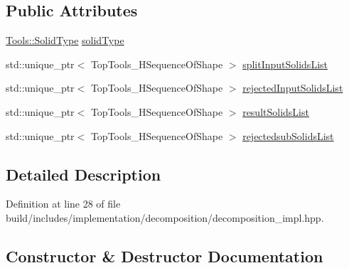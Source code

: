 \subsection*{Public Attributes}
\begin{DoxyCompactItemize}
\item 
\hyperlink{classMcCAD_1_1Tools_1_1SolidType}{Tools\+::\+Solid\+Type} \hyperlink{classMcCAD_1_1Decomposition_1_1Decompose_1_1Impl_a4d66091bde14a60985a5998376612a6c}{solid\+Type}
\item 
std\+::unique\+\_\+ptr$<$ Top\+Tools\+\_\+\+H\+Sequence\+Of\+Shape $>$ \hyperlink{classMcCAD_1_1Decomposition_1_1Decompose_1_1Impl_a9da06719a71fdc8438190a3c3112e82b}{split\+Input\+Solids\+List}
\item 
std\+::unique\+\_\+ptr$<$ Top\+Tools\+\_\+\+H\+Sequence\+Of\+Shape $>$ \hyperlink{classMcCAD_1_1Decomposition_1_1Decompose_1_1Impl_afa4c71b9552009320911095b0e9c638e}{rejected\+Input\+Solids\+List}
\item 
std\+::unique\+\_\+ptr$<$ Top\+Tools\+\_\+\+H\+Sequence\+Of\+Shape $>$ \hyperlink{classMcCAD_1_1Decomposition_1_1Decompose_1_1Impl_a75b53d768ed797dff26c6bf7308f0bea}{result\+Solids\+List}
\item 
std\+::unique\+\_\+ptr$<$ Top\+Tools\+\_\+\+H\+Sequence\+Of\+Shape $>$ \hyperlink{classMcCAD_1_1Decomposition_1_1Decompose_1_1Impl_a513935cebc47e2e4dd599963bfbb8008}{rejectedsub\+Solids\+List}
\end{DoxyCompactItemize}


\subsection{Detailed Description}


Definition at line 28 of file build/includes/implementation/decomposition/decomposition\+\_\+impl.\+hpp.



\subsection{Constructor \& Destructor Documentation}
\mbox{\label{classMcCAD_1_1Decomposition_1_1Decompose_1_1Impl_a24332343b354e30f922a867e90631d6c}} 
